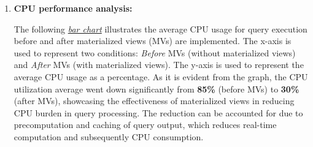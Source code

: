 \begin{enumerate}
\begin{itemize}


\end{itemize} \vspace{.4cm}

\item \textbf{CPU performance analysis:}

The following \hyperref[fig:cpu_usage]{\textit{bar chart}} illustrates the average CPU usage for query execution before and after materialized views (MVs) are implemented. The x-axis is used to represent two conditions: \textit{Before} MVs (without materialized views) and \textit{After} MVs (with materialized views). The y-axis is used to represent the average CPU usage as a percentage. As it is evident from the graph, the CPU utilization average went down significantly from \textbf{85\%} (before MVs) to \textbf{30\%} (after MVs), showcasing the effectiveness of materialized views in reducing CPU burden in query processing. The reduction can be accounted for due to precomputation and caching of query output, which reduces real-time computation and subsequently CPU consumption.

%


\end{enumerate}
